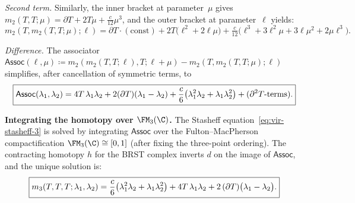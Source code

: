 \smallskip
\emph{Second term.} Similarly, the inner bracket at parameter~$\mu$
gives $m_2(T,T;\mu) = \partial T + 2T\mu + \tfrac{c}{12}\mu^3$,
and the outer bracket at parameter~$\ell$ yields:
\begin{equation}
m_2(T,m_2(T,T;\mu);\ell)
= \partial T\cdot(\text{const})
 + 2T\bigl(\ell^2 + 2\ell\mu\bigr)
 + \tfrac{c}{12}\bigl(\ell^3 + 3\ell^2\mu + 3\ell\mu^2 + 2\mu\ell^3\bigr).
\end{equation}

\smallskip
\emph{Difference.} The associator
$\mathsf{Assoc}(\ell,\mu) \coloneqq
m_2(m_2(T,T;\ell),T;\ell{+}\mu) - m_2(T,m_2(T,T;\mu);\ell)$
simplifies, after cancellation of symmetric terms, to
\begin{equation}
\boxed{%
\mathsf{Assoc}(\lambda_1,\lambda_2)
= 4T\,\lambda_1\lambda_2
 + 2(\partial T)(\lambda_1 - \lambda_2)
 + \frac{c}{6}\bigl(\lambda_1^2\lambda_2 + \lambda_1\lambda_2^2\bigr)
 + (\partial^2 T\text{-terms}).
}
\end{equation}

\medskip
\noindent\textbf{Integrating the homotopy over $\FM_3(\C)$.}
The Stasheff equation~\eqref{eq:vir-stasheff-3} is solved by
integrating $\mathsf{Assoc}$ over the Fulton--MacPherson
compactification $\FM_3(\C) \cong [0,1]$ (after fixing the
three-point ordering). The contracting homotopy $h$ for the
BRST complex inverts $d$ on the image of $\mathsf{Assoc}$,
and the unique solution is:
\begin{equation}
\boxed{%
m_3(T,T,T;\lambda_1,\lambda_2)
= \frac{c}{6}\bigl(\lambda_1^2\lambda_2 + \lambda_1\lambda_2^2\bigr)
 + 4T\,\lambda_1\lambda_2
 + 2\,(\partial T)\bigl(\lambda_1 - \lambda_2\bigr).
}
\end{equation}

